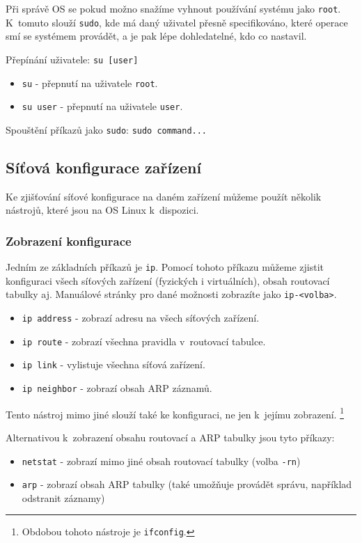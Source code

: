 Při správě OS se pokud možno snažíme vyhnout používání systému jako \texttt{root}. K~tomuto slouží \texttt{sudo},
kde má daný uživatel přesně specifikováno, které operace smí se systémem provádět, a je pak lépe dohledatelné,
kdo co nastavil.

Přepínání uživatele:
\texttt{su [user]}
\begin{itemize}
				\item \texttt{su} - přepnutí na uživatele \texttt{root}.
				\item \texttt{su user} - přepnutí na uživatele \texttt{user}.
\end{itemize}

Spouštění příkazů jako \texttt{sudo}:
\texttt{sudo command...}


\subsection{Síťová konfigurace zařízení}
Ke zjišťování síťové konfigurace na daném zařízení můžeme použít několik nástrojů,
které jsou na OS Linux k~dispozici.

\subsubsection{Zobrazení konfigurace}
Jedním ze základních příkazů je \texttt{ip}. Pomocí tohoto příkazu můžeme zjistit
konfiguraci všech síťových zařízení (fyzických i virtuálních), obsah routovací tabulky aj. Manuálové stránky pro dané možnosti zobrazíte jako \texttt{ip-<volba>}.

\begin{itemize}
				\item \texttt{ip address} - zobrazí adresu na všech síťových zařízení.
				\item \texttt{ip route} - zobrazí všechna pravidla v~routovací tabulce.
				\item \texttt{ip link} - vylistuje všechna síťová zařízení.
				\item \texttt{ip neighbor} - zobrazí obsah ARP záznamů.
\end{itemize}

Tento nástroj mimo jiné slouží také ke konfiguraci, ne jen k~jejímu zobrazení. \footnote{Obdobou tohoto nástroje je \texttt{ifconfig}.}


Alternativou k~zobrazení obsahu routovací a ARP tabulky jsou tyto příkazy:
\begin{itemize}
\item \texttt{netstat} - zobrazí mimo jiné obsah routovací tabulky (volba \texttt{-rn})
\item \texttt{arp} - zobrazí obsah ARP tabulky (také umožňuje provádět správu, například odstranit záznamy)
\end{itemize}


